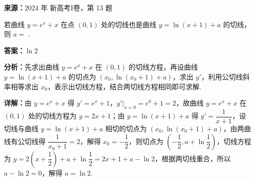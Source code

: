 \begin{question}[points=5]
\textbf{来源：}2024 年 新高考I卷，第 13 题\par
若曲线 $y=e^x+x$ 在点 $(0,1)$ 处的切线也是曲线 $y=\ln(x+1)+a$ 的切线，则 $a=$ .
\fillin[{$\ln 2$}]
\begin{solution}
\textbf{答案：}$\ln 2$

\textbf{分析：}先求出曲线 $y=e^x+x$ 在 $(0,1)$ 的切线方程，再设曲线 $y=\ln(x+1)+a$ 的切点为 $(x_0,\ln(x_0+1)+a)$，求出 $y'$，利用公切线斜率相等求出 $x_0$，表示出切线方程，结合两切线方程相同即可求解.

\textbf{详解：}由 $y=e^x+x$ 得 $y'=e^x+1$，$y'|_{x=0}=e^0+1=2$，故曲线 $y=e^x+x$ 在 $(0,1)$ 处的切线方程为 $y=2x+1$；由 $y=\ln(x+1)+a$ 得 $y'=\dfrac{1}{x+1}$，设切线与曲线 $y=\ln(x+1)+a$ 相切的切点为 $(x_0,\ln(x_0+1)+a)$，由两曲线有公切线得 $\dfrac{1}{x_0+1}=2$，解得 $x_0=-\dfrac{1}{2}$，则切点为 $\left(-\dfrac{1}{2},a+\ln\dfrac{1}{2}\right)$，切线方程为 $y=2\left(x+\dfrac{1}{2}\right)+a+\ln\dfrac{1}{2}=2x+1+a-\ln 2$，根据两切线重合，所以 $a-\ln 2=0$，解得 $a=\ln 2$.
\end{solution}
\end{question}

